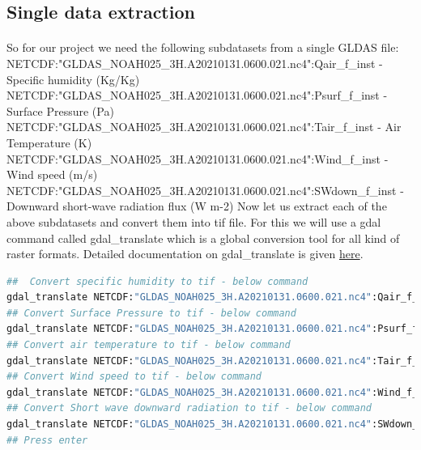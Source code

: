 \subsection{Single data extraction}
\paragraph{}
So for our project we need the following subdatasets from a single GLDAS file:
\newline
\vspace{0.5\baselineskip}
\scriptsize{NETCDF:"GLDAS\_NOAH025\_3H.A20210131.0600.021.nc4":Qair\_f\_inst} \normalsize- Specific humidity (Kg/Kg)
\newline
\vspace{0.5\baselineskip}
\scriptsize{NETCDF:"GLDAS\_NOAH025\_3H.A20210131.0600.021.nc4":Psurf\_f\_inst} \normalsize- Surface Pressure (Pa)
\newline
\vspace{0.5\baselineskip}
\scriptsize{NETCDF:"GLDAS\_NOAH025\_3H.A20210131.0600.021.nc4":Tair\_f\_inst} \normalsize - Air Temperature (K)
\newline
\vspace{0.5\baselineskip}
\scriptsize{NETCDF:"GLDAS\_NOAH025\_3H.A20210131.0600.021.nc4":Wind\_f\_inst } \normalsize - Wind speed (m/s)
\newline
\vspace{0.5\baselineskip}
\scriptsize{NETCDF:"GLDAS\_NOAH025\_3H.A20210131.0600.021.nc4":SWdown\_f\_inst} \normalsize - Downward short-wave radiation flux (W m-2)
\newline
Now let us extract each of the above subdatasets and convert them into tif file. For this we will use a gdal command called \scriptsize{gdal\_translate} \normalsize which is a global conversion tool for all kind of raster formats. 
\newline
Detailed documentation on \scriptsize{gdal\_translate} \normalsize is given \href{https://gdal.org/programs/gdal_translate.html}{here}.
\begin{lstlisting}[language=Bash]
##  Convert specific humidity to tif - below command
gdal_translate NETCDF:"GLDAS_NOAH025_3H.A20210131.0600.021.nc4":Qair_f_inst GLDAS_NOAH025_3H_A20210131_0600_Qair.tif
## Convert Surface Pressure to tif - below command
gdal_translate NETCDF:"GLDAS_NOAH025_3H.A20210131.0600.021.nc4":Psurf_f_inst GLDAS_NOAH025_3H_A20210131_0600_Psurf.tif
## Convert air temperature to tif - below command
gdal_translate NETCDF:"GLDAS_NOAH025_3H.A20210131.0600.021.nc4":Tair_f_inst GLDAS_NOAH025_3H_A20210131_0600_Tair.tif
## Convert Wind speed to tif - below command
gdal_translate NETCDF:"GLDAS_NOAH025_3H.A20210131.0600.021.nc4":Wind_f_inst GLDAS_NOAH025_3H_A20210131_0600_Wind.tif
## Convert Short wave downward radiation to tif - below command
gdal_translate NETCDF:"GLDAS_NOAH025_3H.A20210131.0600.021.nc4":SWdown_f_tavg GLDAS_NOAH025_3H_A20210131_0600_SWdown.tif
## Press enter
\end{lstlisting}
\newpage
